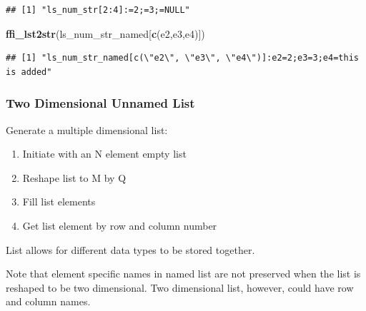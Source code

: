 \documentclass[
]{book}
\newenvironment{Shaded}{\begin{snugshade}}{\end{snugshade}}
\newcommand{\KeywordTok}[1]{\textcolor[rgb]{0.13,0.29,0.53}{\textbf{#1}}}
\newcommand{\NormalTok}[1]{#1}
\newcommand{\StringTok}[1]{\textcolor[rgb]{0.31,0.60,0.02}{#1}}
\providecommand{\tightlist}{%
  \setlength{\itemsep}{0pt}\setlength{\parskip}{0pt}}
\begin{document}
\begin{verbatim}
## [1] "ls_num_str[2:4]:=2;=3;=NULL"
\end{verbatim}

\begin{Shaded}
\begin{Highlighting}[]
\KeywordTok{ffi\_lst2str}\NormalTok{(ls\_num\_str\_named[}\KeywordTok{c}\NormalTok{(}\StringTok{\textquotesingle{}e2\textquotesingle{}}\NormalTok{,}\StringTok{\textquotesingle{}e3\textquotesingle{}}\NormalTok{,}\StringTok{\textquotesingle{}e4\textquotesingle{}}\NormalTok{)])}
\end{Highlighting}
\end{Shaded}

\begin{verbatim}
## [1] "ls_num_str_named[c(\"e2\", \"e3\", \"e4\")]:e2=2;e3=3;e4=this is added"
\end{verbatim}

\hypertarget{two-dimensional-unnamed-list}{%
\subsubsection{Two Dimensional Unnamed List}\label{two-dimensional-unnamed-list}}

Generate a multiple dimensional list:

\begin{enumerate}
\def\labelenumi{\arabic{enumi}.}
\tightlist
\item
  Initiate with an N element empty list
\item
  Reshape list to M by Q
\item
  Fill list elements
\item
  Get list element by row and column number
\end{enumerate}

List allows for different data types to be stored together.

Note that element specific names in named list are not preserved when the list is reshaped to be two dimensional. Two dimensional list, however, could have row and column names.
\end{document}
